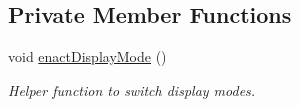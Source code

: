 \subsection*{Private Member Functions}
\begin{DoxyCompactItemize}
\item 
\hypertarget{class_u_i_1_1_media_item_widget_a1f19a20fc857e17c072f447de5e8059f}{void \hyperlink{class_u_i_1_1_media_item_widget_a1f19a20fc857e17c072f447de5e8059f}{enact\-Display\-Mode} ()}\label{class_u_i_1_1_media_item_widget_a1f19a20fc857e17c072f447de5e8059f}

\begin{DoxyCompactList}\small\item\em Helper function to switch display modes. \end{DoxyCompactList}\end{DoxyCompactItemize}
